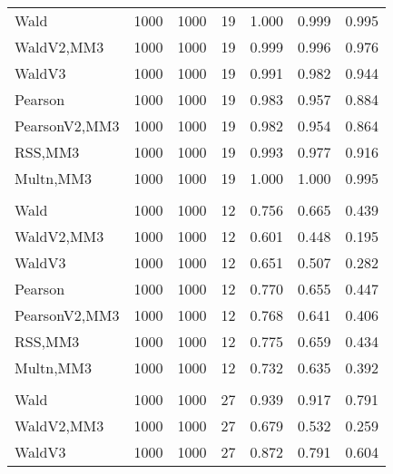 \documentclass[
]{article}
\begin{document}
\begin{table}[H]
{\begin{tabular}[t]{lrrrrrr}
\hspace{1em}Wald & 1000 & 1000 & 19 & 1.000 & 0.999 & 0.995\\
\hspace{1em}WaldV2,MM3 & 1000 & 1000 & 19 & 0.999 & 0.996 & 0.976\\
\hspace{1em}WaldV3 & 1000 & 1000 & 19 & 0.991 & 0.982 & 0.944\\
\hspace{1em}Pearson & 1000 & 1000 & 19 & 0.983 & 0.957 & 0.884\\
\hspace{1em}PearsonV2,MM3 & 1000 & 1000 & 19 & 0.982 & 0.954 & 0.864\\
\hspace{1em}RSS,MM3 & 1000 & 1000 & 19 & 0.993 & 0.977 & 0.916\\
\hspace{1em}Multn,MM3 & 1000 & 1000 & 19 & 1.000 & 1.000 & 0.995\\
\addlinespace[0.3em]
\multicolumn{7}{l}{\textbf{2F 10V}}\\
\hspace{1em}Wald & 1000 & 1000 & 12 & 0.756 & 0.665 & 0.439\\
\hspace{1em}WaldV2,MM3 & 1000 & 1000 & 12 & 0.601 & 0.448 & 0.195\\
\hspace{1em}WaldV3 & 1000 & 1000 & 12 & 0.651 & 0.507 & 0.282\\
\hspace{1em}Pearson & 1000 & 1000 & 12 & 0.770 & 0.655 & 0.447\\
\hspace{1em}PearsonV2,MM3 & 1000 & 1000 & 12 & 0.768 & 0.641 & 0.406\\
\hspace{1em}RSS,MM3 & 1000 & 1000 & 12 & 0.775 & 0.659 & 0.434\\
\hspace{1em}Multn,MM3 & 1000 & 1000 & 12 & 0.732 & 0.635 & 0.392\\
\addlinespace[0.3em]
\multicolumn{7}{l}{\textbf{3F 15V}}\\
\hspace{1em}Wald & 1000 & 1000 & 27 & 0.939 & 0.917 & 0.791\\
\hspace{1em}WaldV2,MM3 & 1000 & 1000 & 27 & 0.679 & 0.532 & 0.259\\
\hspace{1em}WaldV3 & 1000 & 1000 & 27 & 0.872 & 0.791 & 0.604\\

\end{tabular}}
\end{table}
\end{document}
